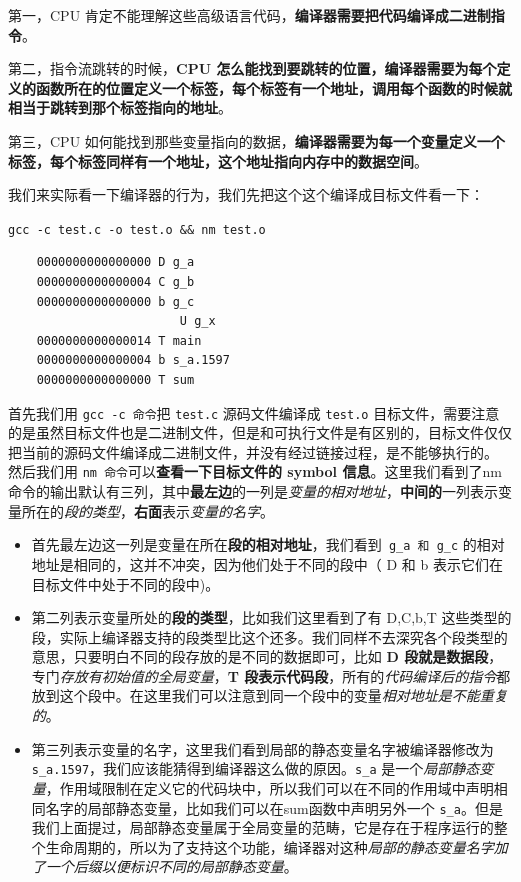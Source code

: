 \documentclass[UTF8,a4paper,12pt]{ctexbook}
\begin{document}
				第一，CPU 肯定不能理解这些高级语言代码，\textbf{编译器需要把代码编译成二进制指令}。 
				
				第二，指令流跳转的时候，\textbf{CPU 怎么能找到要跳转的位置，编译器需要为每个定义的函数所在的位置定义一个标签，每个标签有一个地址，调用每个函数的时候就相当于跳转到那个标签指向的地址}。 
				
				第三，CPU 如何能找到那些变量指向的数据，\textbf{编译器需要为每一个变量定义一个标签，每个标签同样有一个地址，这个地址指向内存中的数据空间}。
			
				我们来实际看一下编译器的行为，我们先把这个这个编译成目标文件看一下：
				
				\verb|gcc -c test.c -o test.o && nm test.o|
				\begin{lstlisting}
	0000000000000000 D g_a
	0000000000000004 C g_b
	0000000000000000 b g_c
					    U g_x
	0000000000000014 T main
	0000000000000004 b s_a.1597
	0000000000000000 T sum
				\end{lstlisting}
				
				
				首先我们用 \verb|gcc -c 命令|把 \verb|test.c| 源码文件编译成 \verb|test.o| 目标文件，需要注意的是虽然目标文件也是二进制文件，但是和可执行文件是有区别的，目标文件仅仅把当前的源码文件编译成二进制文件，并没有经过链接过程，是不能够执行的。
				然后我们用 \verb|nm 命令|可以\textbf{查看一下目标文件的 symbol 信息}。这里我们看到了nm命令的输出默认有三列，其中\textbf{最左边}的一列是\textit{变量的相对地址}，\textbf{中间的}一列表示变量所在的\textit{段的类型}，\textbf{右面}表示\textit{变量的名字}。
				
				\begin{itemize}
					\item 首先最左边这一列是变量在所在\textbf{段的相对地址}，我们看到\verb| g_a 和 g_c| 的相对地址是相同的，这并不冲突，因为他们处于不同的段中（ D 和 b 表示它们在目标文件中处于不同的段中)。
					\item 第二列表示变量所处的\textbf{段的类型}，比如我们这里看到了有 D,C,b,T 这些类型的段，实际上编译器支持的段类型比这个还多。我们同样不去深究各个段类型的意思，只要明白不同的段存放的是不同的数据即可，比如 \textbf{D 段就是数据段}，专门\textit{存放有初始值的全局变量}，\textbf{T 段表示代码段}，所有的\textit{代码编译后的指令}都放到这个段中。在这里我们可以注意到同一个段中的变量\textit{相对地址是不能重复的}。
					\item 第三列表示变量的名字，这里我们看到局部的静态变量名字被编译器修改为 \verb|s_a.1597|，我们应该能猜得到编译器这么做的原因。\verb|s_a| 是一个\textit{局部静态变量}，作用域限制在定义它的代码块中，所以我们可以在不同的作用域中声明相同名字的局部静态变量，比如我们可以在sum函数中声明另外一个 \verb|s_a|。但是我们上面提过，局部静态变量属于全局变量的范畴，它是存在于程序运行的整个生命周期的，所以为了支持这个功能，编译器对这种\textit{局部的静态变量名字加了一个后缀以便标识不同的局部静态变量}。
				\end{itemize}
				
\end{document}
